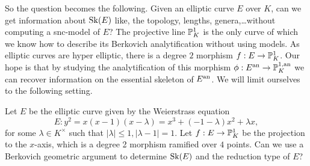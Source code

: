 So the question becomes the following. Given an elliptic curve $E$ over $K$, can we get information about $\operatorname{Sk}(E)$ like, the topology, lengths, genera,\ldots without computing a snc-model of  $E$?
The projective line $\mathbb{P}^{1}_K$ is the only curve of which we know how to describe its Berkovich analytification without using models. 
As elliptic curves are hyper elliptic, there is a degree $2$ morphism $f: E \to \mathbb{P}^{1}_K$. 
Our hope is that by studying the analytification of this morphism $\phi: E\an \to \pro^{1, \text{an}}_K$ we can recover information on the essential skeleton of $E{}^{\text{an}}$. 
We will limit ourselves to the following setting.
\begin{problem}\label{prob:main_problem}
	Let $E$ be the elliptic curve given by the Weierstrass equation 
	\begin{equation}\label{eq:weierstrass_problem}
		E: y^2 = x(x-1)(x-\lambda) = x^3 + (-1 - \lambda) x^2 + \lambda x
	,\end{equation}
	for some $\lambda \in K^\times $ such that $|\lambda| \le 1, |\lambda - 1| = 1$. 
	Let $f: E \to \mathbb{P}^{1}_K$ be the projection to the $x$-axis, which is a degree 2 morphism ramified over $4$ points.
	Can we use a Berkovich geometric argument to determine $\operatorname{Sk}(E)$ and the reduction type of $E $?
\end{problem}
\setlength{\LTcapwidth}{5.7in}
